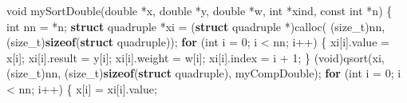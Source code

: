 \documentclass[
  12pt,
  letterpaper,
  DIV=11,
  numbers=noendperiod]{scrreprt}
\newenvironment{Shaded}{\begin{snugshade}}{\end{snugshade}}
\newcommand{\ControlFlowTok}[1]{\textcolor[rgb]{0.00,0.23,0.31}{\textbf{#1}}}
\newcommand{\DataTypeTok}[1]{\textcolor[rgb]{0.68,0.00,0.00}{#1}}
\newcommand{\DecValTok}[1]{\textcolor[rgb]{0.68,0.00,0.00}{#1}}
\newcommand{\KeywordTok}[1]{\textcolor[rgb]{0.00,0.23,0.31}{\textbf{#1}}}
\newcommand{\NormalTok}[1]{\textcolor[rgb]{0.00,0.23,0.31}{#1}}
\newcommand{\OperatorTok}[1]{\textcolor[rgb]{0.37,0.37,0.37}{#1}}
\theoremstyle{remark}
\begin{document}
\begin{Shaded}
\begin{Highlighting}[]
\DataTypeTok{void}\NormalTok{ mySortDouble}\OperatorTok{(}\DataTypeTok{double} \OperatorTok{*}\NormalTok{x}\OperatorTok{,} \DataTypeTok{double} \OperatorTok{*}\NormalTok{y}\OperatorTok{,} \DataTypeTok{double} \OperatorTok{*}\NormalTok{w}\OperatorTok{,} \DataTypeTok{int} \OperatorTok{*}\NormalTok{xind}\OperatorTok{,} \DataTypeTok{const} \DataTypeTok{int} \OperatorTok{*}\NormalTok{n}\OperatorTok{)} \OperatorTok{\{}
    \DataTypeTok{int}\NormalTok{ nn }\OperatorTok{=} \OperatorTok{*}\NormalTok{n}\OperatorTok{;}
    \KeywordTok{struct}\NormalTok{ quadruple }\OperatorTok{*}\NormalTok{xi }\OperatorTok{=} \OperatorTok{(}\KeywordTok{struct}\NormalTok{ quadruple }\OperatorTok{*)}\NormalTok{calloc}\OperatorTok{(}
        \OperatorTok{(}\DataTypeTok{size\_t}\OperatorTok{)}\NormalTok{nn}\OperatorTok{,} \OperatorTok{(}\DataTypeTok{size\_t}\OperatorTok{)}\KeywordTok{sizeof}\OperatorTok{(}\KeywordTok{struct}\NormalTok{ quadruple}\OperatorTok{));}
    \ControlFlowTok{for} \OperatorTok{(}\DataTypeTok{int}\NormalTok{ i }\OperatorTok{=} \DecValTok{0}\OperatorTok{;}\NormalTok{ i }\OperatorTok{\textless{}}\NormalTok{ nn}\OperatorTok{;}\NormalTok{ i}\OperatorTok{++)} \OperatorTok{\{}
\NormalTok{        xi}\OperatorTok{[}\NormalTok{i}\OperatorTok{].}\NormalTok{value }\OperatorTok{=}\NormalTok{ x}\OperatorTok{[}\NormalTok{i}\OperatorTok{];}
\NormalTok{        xi}\OperatorTok{[}\NormalTok{i}\OperatorTok{].}\NormalTok{result }\OperatorTok{=}\NormalTok{ y}\OperatorTok{[}\NormalTok{i}\OperatorTok{];}
\NormalTok{        xi}\OperatorTok{[}\NormalTok{i}\OperatorTok{].}\NormalTok{weight }\OperatorTok{=}\NormalTok{ w}\OperatorTok{[}\NormalTok{i}\OperatorTok{];}
\NormalTok{        xi}\OperatorTok{[}\NormalTok{i}\OperatorTok{].}\NormalTok{index }\OperatorTok{=}\NormalTok{ i }\OperatorTok{+} \DecValTok{1}\OperatorTok{;}
    \OperatorTok{\}}
    \OperatorTok{(}\DataTypeTok{void}\OperatorTok{)}\NormalTok{qsort}\OperatorTok{(}\NormalTok{xi}\OperatorTok{,} \OperatorTok{(}\DataTypeTok{size\_t}\OperatorTok{)}\NormalTok{nn}\OperatorTok{,} \OperatorTok{(}\DataTypeTok{size\_t}\OperatorTok{)}\KeywordTok{sizeof}\OperatorTok{(}\KeywordTok{struct}\NormalTok{ quadruple}\OperatorTok{),}\NormalTok{ myCompDouble}\OperatorTok{);}
    \ControlFlowTok{for} \OperatorTok{(}\DataTypeTok{int}\NormalTok{ i }\OperatorTok{=} \DecValTok{0}\OperatorTok{;}\NormalTok{ i }\OperatorTok{\textless{}}\NormalTok{ nn}\OperatorTok{;}\NormalTok{ i}\OperatorTok{++)} \OperatorTok{\{}
\NormalTok{        x}\OperatorTok{[}\NormalTok{i}\OperatorTok{]} \OperatorTok{=}\NormalTok{ xi}\OperatorTok{[}\NormalTok{i}\OperatorTok{].}\NormalTok{value}\OperatorTok{;}

\end{Highlighting}
\end{Shaded}
\end{document}
